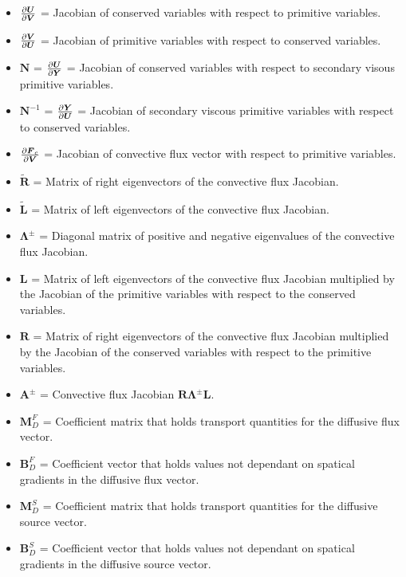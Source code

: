 \documentclass[10pt]{article}
\begin{document}
\begin{flushleft}
\begin{itemize}
    \item $ \frac{\partial \boldsymbol{U}}{\partial \boldsymbol{V}}$ = Jacobian of conserved variables with respect to primitive variables.
    \item $\frac{\partial \boldsymbol{V}}{\partial \boldsymbol{U}}$ = Jacobian of primitive variables with respect to conserved variables.
    \item $\boldsymbol{N}$ = $\frac{\partial \boldsymbol{U}}{\partial \boldsymbol{Y}}$ = Jacobian of conserved variables with respect to secondary visous primitive variables.
    \item $\boldsymbol{N}^{-1}$ = $\frac{\partial \boldsymbol{Y}}{\partial \boldsymbol{U}}$ = Jacobian of secondary viscous primitive variables with respect to conserved variables.
    \item $\frac{\partial \boldsymbol{F}_c}{\partial \boldsymbol{V}}$ = Jacobian of convective flux vector with respect to primitive variables.
    \item $\tilde{\boldsymbol{R}}$ = Matrix of right eigenvectors of the convective flux Jacobian.
    \item $\tilde{\boldsymbol{L}}$ = Matrix of left eigenvectors of the convective flux Jacobian.
    \item $\boldsymbol{\Lambda}^\pm$ = Diagonal matrix of positive and negative eigenvalues of the convective flux Jacobian.
    \item $\boldsymbol{L}$ = Matrix of left eigenvectors of the convective flux Jacobian multiplied by the Jacobian of the primitive variables with respect to the conserved variables.
    \item $\boldsymbol{R}$ = Matrix of right eigenvectors of the convective flux Jacobian multiplied by the Jacobian of the conserved variables with respect to the primitive variables.
    \item $\boldsymbol{A}^\pm$ = Convective flux Jacobian $\boldsymbol{R} \boldsymbol{\Lambda}^\pm \boldsymbol{L}$.
    \item $\boldsymbol{M}_D^F$ = Coefficient matrix that holds transport quantities for the diffusive flux vector. 
    \item $\boldsymbol{B}_D^F$ = Coefficient vector that holds values not dependant on spatical gradients in the diffusive flux vector.
    \item $\boldsymbol{M}_D^S$ = Coefficient matrix that holds transport quantities for the diffusive source vector.
    \item $\boldsymbol{B}_D^S$ = Coefficient vector that holds values not dependant on spatical gradients in the diffusive source vector.

\end{itemize}
\end{flushleft}
\end{document}

